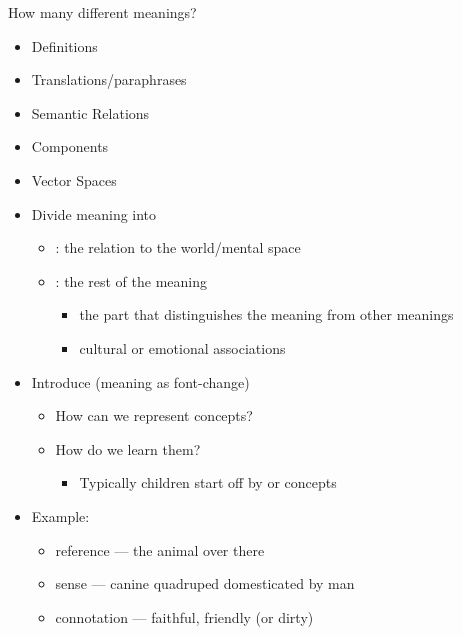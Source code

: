 \documentclass[a4paper,landscape,headrule,footrule,xetex]{foils}
\begin{document}
How many different meanings?\task



\begin{itemize}
\item Definitions
\item Translations/paraphrases
\item Semantic Relations
\item Components
\item Vector Spaces
\end{itemize}



\begin{itemize}\addtolength{\itemsep}{-1ex}
\item Divide meaning into
  \begin{itemize}
  \item {}: the relation to the world/mental space
  \item {}: the rest of the meaning
    \begin{itemize}
    \item {} the part that distinguishes the meaning
      from other meanings
    \item {}  cultural or emotional associations 
    \end{itemize}
  \end{itemize}
\item Introduce  \hfill (meaning as font-change)
  \begin{itemize}
  \item How can we represent concepts?
  \item How do we learn them?
    \begin{itemize}
    \item Typically children start off by  or  concepts
    \end{itemize}
  \end{itemize}
\item Example: 
  \begin{itemize}
  \item reference --- the animal over there
  \item sense --- canine quadruped domesticated by man
  \item connotation --- faithful, friendly (or dirty)
  \end{itemize}
\end{itemize}
\end{document}
